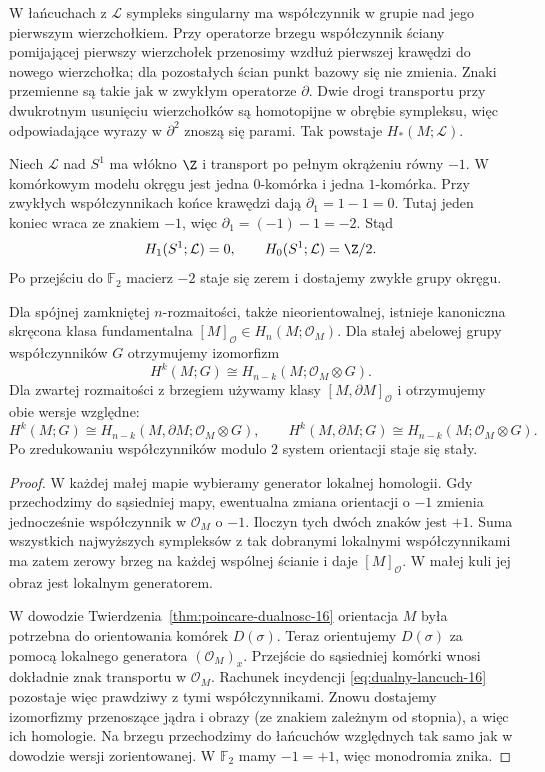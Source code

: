 W łańcuchach z $\mathcal L$
sympleks singularny ma
współczynnik w grupie
nad jego pierwszym
wierzchołkiem. Przy operatorze
brzegu współczynnik ściany
pomijającej pierwszy
wierzchołek przenosimy
wzdłuż pierwszej krawędzi
do nowego wierzchołka;
dla pozostałych ścian
punkt bazowy się nie
zmienia. Znaki przemienne
są takie jak w zwykłym
operatorze $\partial$.
Dwie drogi transportu
przy dwukrotnym usunięciu
wierzchołków są homotopijne
w obrębie sympleksu,
więc odpowiadające
wyrazy w $\partial^2$
znoszą się parami.
Tak powstaje
$H_*(M;\mathcal L)$.

\begin{przyklad}
Niech $\mathcal L$ nad $S^1$
ma włókno $\Z$ i transport
po pełnym okrążeniu
równy $-1$. W komórkowym
modelu okręgu jest
jedna $0$-komórka
i jedna $1$-komórka.
Przy zwykłych
współczynnikach końce
krawędzi dają
$\partial_1=1-1=0$.
Tutaj jeden koniec
wraca ze znakiem
$-1$, więc
$\partial_1=(-1)-1=-2$.
Stąd
\[
 H_1(S^1;\mathcal L)=0,\qquad
 H_0(S^1;\mathcal L)=\Z/2.
\]
Po przejściu do
$\mathbb F_2$ macierz
$-2$ staje się zerem
i dostajemy zwykłe
grupy okręgu.
\end{przyklad}

\begin{twierdzenie}
\label{thm:pd-skrecenie-16}
Dla spójnej zamkniętej
$n$-rozmaitości, także
nieorientowalnej, istnieje
kanoniczna skręcona klasa
fundamentalna
$[M]_{\mathcal O}\in
H_n(M;\mathcal O_M)$.
Dla stałej abelowej grupy
współczynników $G$
otrzymujemy izomorfizm
\[
 H^k(M;G)\cong
 H_{n-k}(M;\mathcal O_M\otimes G).
\]
Dla zwartej rozmaitości z brzegiem używamy
klasy $[M,\partial M]_{\mathcal O}$ i otrzymujemy
obie wersje względne:
\[
 H^k(M;G)\cong H_{n-k}(M,\partial M;\mathcal O_M\otimes G),
 \qquad
 H^k(M,\partial M;G)\cong H_{n-k}(M;\mathcal O_M\otimes G).
\]
Po zredukowaniu
współczynników modulo $2$
system orientacji staje
się stały.
\end{twierdzenie}
\begin{proof}
W każdej małej mapie
wybieramy generator
lokalnej homologii.
Gdy przechodzimy
do sąsiedniej mapy,
ewentualna zmiana
orientacji o $-1$
zmienia jednocześnie
współczynnik w
$\mathcal O_M$ o $-1$.
Iloczyn tych dwóch
znaków jest $+1$.
Suma wszystkich
najwyższych sympleksów
z tak dobranymi
lokalnymi współczynnikami
ma zatem zerowy brzeg
na każdej wspólnej
ścianie i daje
$[M]_{\mathcal O}$.
W małej kuli jej obraz
jest lokalnym generatorem.

W dowodzie
Twierdzenia~\ref{thm:poincare-dualnosc-16}
orientacja $M$ była
potrzebna do orientowania
komórek $D(\sigma)$.
Teraz orientujemy
$D(\sigma)$ za pomocą
lokalnego generatora
$(\mathcal O_M)_x$.
Przejście do sąsiedniej
komórki wnosi dokładnie
znak transportu
w $\mathcal O_M$.
Rachunek incydencji
\eqref{eq:dualny-lancuch-16}
pozostaje więc prawdziwy
z tymi współczynnikami.
Znowu dostajemy
izomorfizmy przenoszące jądra i obrazy
(ze znakiem zależnym od stopnia), a więc ich homologie.
Na brzegu przechodzimy
do łańcuchów względnych
tak samo jak w dowodzie
wersji zorientowanej.
W $\mathbb F_2$
mamy $-1=+1$,
więc monodromia znika.
\end{proof}


